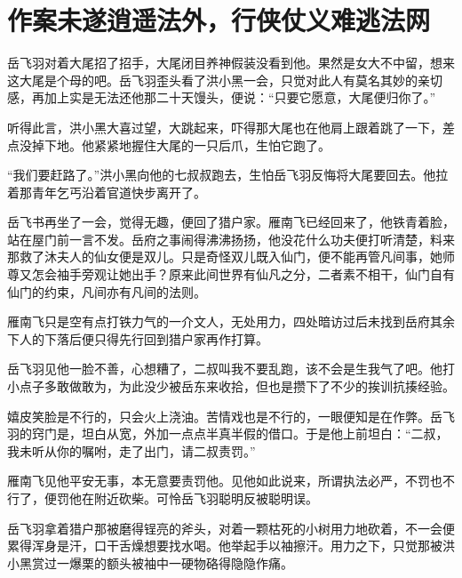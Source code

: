 \chapter{作案未遂逍遥法外，行侠仗义难逃法网}

岳飞羽对着大尾招了招手，大尾闭目养神假装没看到他。果然是女大不中留，想来这大尾是个母的吧。岳飞羽歪头看了洪小黑一会，只觉对此人有莫名其妙的亲切感，再加上实是无法还他那二十天馒头，便说：“只要它愿意，大尾便归你了。”

听得此言，洪小黑大喜过望，大跳起来，吓得那大尾也在他肩上跟着跳了一下，差点没掉下地。他紧紧地握住大尾的一只后爪，生怕它跑了。

“我们要赶路了。”洪小黑向他的七叔叔跑去，生怕岳飞羽反悔将大尾要回去。他拉着那青年乞丐沿着官道快步离开了。

岳飞书再坐了一会，觉得无趣，便回了猎户家。雁南飞已经回来了，他铁青着脸，站在屋门前一言不发。岳府之事闹得沸沸扬扬，他没花什么功夫便打听清楚，料来那救了沐夫人的仙女便是双儿。只是奇怪双儿既入仙门，便不能再管凡间事，她师尊又怎会袖手旁观让她出手？原来此间世界有仙凡之分，二者素不相干，仙门自有仙门的约束，凡间亦有凡间的法则。

雁南飞只是空有点打铁力气的一介文人，无处用力，四处暗访过后未找到岳府其余下人的下落后便只得先行回到猎户家再作打算。

岳飞羽见他一脸不善，心想糟了，二叔叫我不要乱跑，该不会是生我气了吧。他打小点子多敢做敢为，为此没少被岳东来收拾，但也是攒下了不少的挨训抗揍经验。

嬉皮笑脸是不行的，只会火上浇油。苦情戏也是不行的，一眼便知是在作弊。岳飞羽的窍门是，坦白从宽，外加一点点半真半假的借口。于是他上前坦白：“二叔，我未听从你的嘱咐，走了出门，请二叔责罚。”

雁南飞见他平安无事，本无意要责罚他。见他如此说来，所谓执法必严，不罚也不行了，便罚他在附近砍柴。可怜岳飞羽聪明反被聪明误。

岳飞羽拿着猎户那被磨得锃亮的斧头，对着一颗枯死的小树用力地砍着，不一会便累得浑身是汗，口干舌燥想要找水喝。他举起手以袖擦汗。用力之下，只觉那被洪小黑赏过一爆栗的额头被袖中一硬物硌得隐隐作痛。




\section{}
\section{}
\section{}

